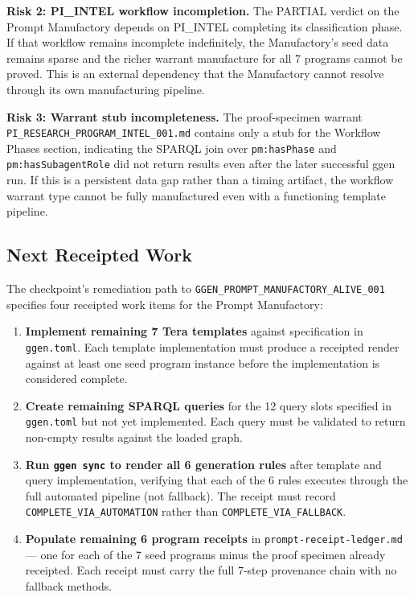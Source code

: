 \textbf{Risk 2: PI\_INTEL workflow incompletion.} The PARTIAL verdict on the Prompt
Manufactory depends on PI\_INTEL completing its classification phase. If that workflow
remains incomplete indefinitely, the Manufactory's seed data remains sparse and the
richer warrant manufacture for all 7 programs cannot be proved. This is an external
dependency that the Manufactory cannot resolve through its own manufacturing pipeline.

\textbf{Risk 3: Warrant stub incompleteness.} The proof-specimen warrant
\texttt{PI\_RESEARCH\_PROGRAM\_INTEL\_001.md} contains only a stub for the Workflow
Phases section, indicating the SPARQL join over \texttt{pm:hasPhase} and
\texttt{pm:hasSubagentRole} did not return results even after the later successful ggen
run. If this is a persistent data gap rather than a timing artifact, the workflow warrant
type cannot be fully manufactured even with a functioning template pipeline.

\subsection{Next Receipted Work}
\label{sec:research-prompt-manufactory-open-next}

The checkpoint's remediation path to \texttt{GGEN\_PROMPT\_MANUFACTORY\_ALIVE\_001}
specifies four receipted work items for the Prompt Manufactory:

\begin{enumerate}
  \item \textbf{Implement remaining 7 Tera templates} against specification in
    \texttt{ggen.toml}. Each template implementation must produce a receipted render
    against at least one seed program instance before the implementation is considered
    complete.

  \item \textbf{Create remaining SPARQL queries} for the 12 query slots specified in
    \texttt{ggen.toml} but not yet implemented. Each query must be validated to return
    non-empty results against the loaded graph.

  \item \textbf{Run \texttt{ggen sync} to render all 6 generation rules} after template
    and query implementation, verifying that each of the 6 rules executes through the
    full automated pipeline (not fallback). The receipt must record
    \texttt{COMPLETE\_VIA\_AUTOMATION} rather than \texttt{COMPLETE\_VIA\_FALLBACK}.

  \item \textbf{Populate remaining 6 program receipts} in
    \texttt{prompt-receipt-ledger.md} --- one for each of the 7 seed programs minus the
    proof specimen already receipted. Each receipt must carry the full 7-step provenance
    chain with no fallback methods.
\end{enumerate}

